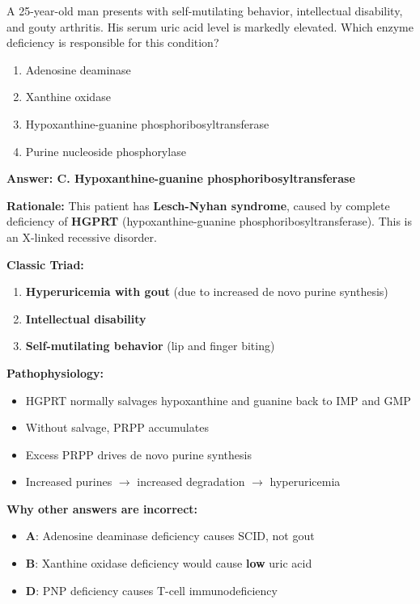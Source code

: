 \begin{exercise}
A 25-year-old man presents with self-mutilating behavior, intellectual disability, and gouty arthritis. His serum uric acid level is markedly elevated. Which enzyme deficiency is responsible for this condition?
\begin{enumerate}[label=\Alph*.]
    \item Adenosine deaminase
    \item Xanthine oxidase
    \item Hypoxanthine-guanine phosphoribosyltransferase
    \item Purine nucleoside phosphorylase
\end{enumerate}
\end{exercise}

\begin{solution}
\textbf{Answer: C. Hypoxanthine-guanine phosphoribosyltransferase}

\textbf{Rationale:} This patient has \textbf{Lesch-Nyhan syndrome}, caused by complete deficiency of \textbf{HGPRT} (hypoxanthine-guanine phosphoribosyltransferase). This is an X-linked recessive disorder.

\textbf{Classic Triad:}
\begin{enumerate}
    \item \textbf{Hyperuricemia with gout} (due to increased de novo purine synthesis)
    \item \textbf{Intellectual disability}
    \item \textbf{Self-mutilating behavior} (lip and finger biting)
\end{enumerate}

\textbf{Pathophysiology:}
\begin{itemize}
    \item HGPRT normally salvages hypoxanthine and guanine back to IMP and GMP
    \item Without salvage, PRPP accumulates
    \item Excess PRPP drives de novo purine synthesis
    \item Increased purines $\rightarrow$ increased degradation $\rightarrow$ hyperuricemia
\end{itemize}

\textbf{Why other answers are incorrect:}
\begin{itemize}
    \item \textbf{A}: Adenosine deaminase deficiency causes SCID, not gout
    \item \textbf{B}: Xanthine oxidase deficiency would cause \textbf{low} uric acid
    \item \textbf{D}: PNP deficiency causes T-cell immunodeficiency
\end{itemize}
\end{solution}

